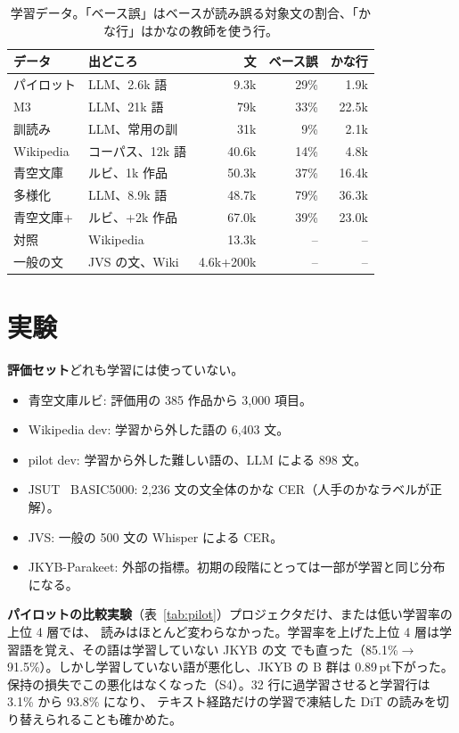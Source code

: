 \documentclass[10pt,a4paper,twocolumn]{article}
\newcommand{\pt}{\,pt}
\begin{document}
\begin{table}[t]
\centering\footnotesize\setlength{\tabcolsep}{3pt}
\caption{学習データ。「ベース誤」はベースが読み誤る対象文の割合、「かな行」はかなの教師を使う行。}
\label{tab:data}
\begin{tabular}{@{}llrrr@{}}
\toprule
データ & 出どころ & 文 & ベース誤 & かな行\\
\midrule
パイロット & LLM、2.6k 語 & 9.3k & 29\% & 1.9k\\
M3 & LLM、21k 語 & 79k & 33\% & 22.5k\\
訓読み & LLM、常用の訓 & 31k & 9\% & 2.1k\\
Wikipedia & コーパス、12k 語 & 40.6k & 14\% & 4.8k\\
青空文庫 & ルビ、1k 作品 & 50.3k & 37\% & 16.4k\\
多様化 & LLM、8.9k 語 & 48.7k & 79\% & 36.3k\\
青空文庫+ & ルビ、+2k 作品 & 67.0k & 39\% & 23.0k\\
対照 & Wikipedia & 13.3k & -- & --\\
一般の文 & JVS の文、Wiki & 4.6k+200k & -- & --\\
\bottomrule
\end{tabular}
\end{table}

\section{実験}\label{sec:exp}
\textbf{評価セット}\quad どれも学習には使っていない。
\begin{itemize}
\item 青空文庫ルビ: 評価用の 385 作品から 3,000 項目。
\item Wikipedia dev: 学習から外した語の 6,403 文。
\item pilot dev: 学習から外した難しい語の、LLM による 898 文。
\item JSUT~\cite{jsut} BASIC5000: 2,236 文の文全体のかな CER（人手のかなラベルが正解）。
\item JVS: 一般の 500 文の Whisper による CER。
\item JKYB-Parakeet: 外部の指標。初期の段階にとっては一部が学習と同じ分布になる。
\end{itemize}

\textbf{パイロットの比較実験}（表~\ref{tab:pilot}）\quad プロジェクタだけ、または低い学習率の上位 4 層では、
読みはほとんど変わらなかった。学習率を上げた上位 4 層は学習語を覚え、その語は学習していない JKYB の文
でも直った（85.1\%$\to$91.5\%）。しかし学習していない語が悪化し、JKYB の B 群は 0.89\pt 下がった。
保持の損失でこの悪化はなくなった（S4）。32 行に過学習させると学習行は 3.1\% から 93.8\% になり、
テキスト経路だけの学習で凍結した DiT の読みを切り替えられることも確かめた。
\end{document}
